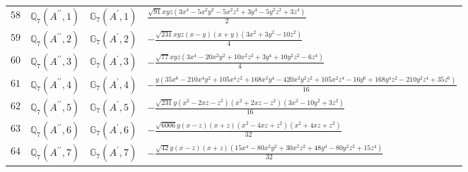 \documentclass[fleqn,8pt,landscape]{jsarticle}
\begin{document}
\begin{table}[ht!]
\begin{center}
\begin{tabular}{cccl}
$ 58 $ & $ \mathbb{Q}_{7}(A^{\prime\prime},1) $ & $ \mathbb{G}_{7}(A^{\prime},1) $ & $ \frac{\sqrt{91} x y z \left(3 x^{4} - 5 x^{2} y^{2} - 5 x^{2} z^{2} + 3 y^{4} - 5 y^{2} z^{2} + 3 z^{4}\right)}{2} $ \\
$ 59 $ & $ \mathbb{Q}_{7}(A^{\prime\prime},2) $ & $ \mathbb{G}_{7}(A^{\prime},2) $ & $ - \frac{\sqrt{231} x y z \left(x - y\right) \left(x + y\right) \left(3 x^{2} + 3 y^{2} - 10 z^{2}\right)}{4} $ \\
$ 60 $ & $ \mathbb{Q}_{7}(A^{\prime\prime},3) $ & $ \mathbb{G}_{7}(A^{\prime},3) $ & $ - \frac{\sqrt{77} x y z \left(3 x^{4} - 20 x^{2} y^{2} + 10 x^{2} z^{2} + 3 y^{4} + 10 y^{2} z^{2} - 6 z^{4}\right)}{4} $ \\
$ 61 $ & $ \mathbb{Q}_{7}(A^{\prime\prime},4) $ & $ \mathbb{G}_{7}(A^{\prime},4) $ & $ - \frac{y \left(35 x^{6} - 210 x^{4} y^{2} + 105 x^{4} z^{2} + 168 x^{2} y^{4} - 420 x^{2} y^{2} z^{2} + 105 x^{2} z^{4} - 16 y^{6} + 168 y^{4} z^{2} - 210 y^{2} z^{4} + 35 z^{6}\right)}{16} $ \\
$ 62 $ & $ \mathbb{Q}_{7}(A^{\prime\prime},5) $ & $ \mathbb{G}_{7}(A^{\prime},5) $ & $ - \frac{\sqrt{231} y \left(x^{2} - 2 x z - z^{2}\right) \left(x^{2} + 2 x z - z^{2}\right) \left(3 x^{2} - 10 y^{2} + 3 z^{2}\right)}{16} $ \\
$ 63 $ & $ \mathbb{Q}_{7}(A^{\prime\prime},6) $ & $ \mathbb{G}_{7}(A^{\prime},6) $ & $ - \frac{\sqrt{6006} y \left(x - z\right) \left(x + z\right) \left(x^{2} - 4 x z + z^{2}\right) \left(x^{2} + 4 x z + z^{2}\right)}{32} $ \\
$ 64 $ & $ \mathbb{Q}_{7}(A^{\prime\prime},7) $ & $ \mathbb{G}_{7}(A^{\prime},7) $ & $ - \frac{\sqrt{42} y \left(x - z\right) \left(x + z\right) \left(15 x^{4} - 80 x^{2} y^{2} + 30 x^{2} z^{2} + 48 y^{4} - 80 y^{2} z^{2} + 15 z^{4}\right)}{32} $ \\
 \hline \hline
\end{tabular}
\end{center}
\end{table}
\end{document}
